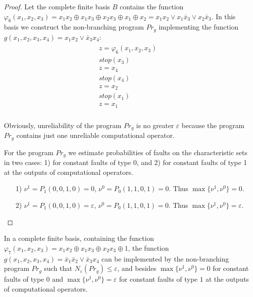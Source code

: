 \documentclass[
11pt,%
tightenlines,%
twoside,%
onecolumn,%
nofloats,%
nobibnotes,%
nofootinbib,%
superscriptaddress,%
noshowpacs,%
centertags]%
{revtex4}
\begin{document}
\begin{proof}
Let the complete finite basis $B$ contains  the function
$\varphi_6(x_1, x_2, x_3)=x_1 x_2\oplus x_1 x_3 \oplus x_2 x_3
\oplus x_1\oplus x_2 =x_1x_2\vee x_1\bar{x}_3\vee x_2\bar{x}_3$. In
this basis we construct the non-branching program $Pr_g$
implementing the function $g(x_1, x_2, x_3, x_4)= x_1 x_2 \vee
\bar{x}_3 x_4$:
\begin{eqnarray*}
\begin{array}{l}
  z=\varphi_6(x_1, x_2, x_3) \\
  stop(x_3) \\
  z=x_4 \\
  stop(x_4) \\
  z=x_2 \\
  stop(x_1) \\
  z=x_1 \\
\end{array}
\end{eqnarray*}

Obviously, unreliability of the program $Pr_g$ is no  greater
$\varepsilon$ because the program $Pr_g$ contains just one
unreliable computational operator.

For the program $Pr_g$ we estimate probabilities of faults  on the
characteristic sets in two cases: 1) for constant faults of type 0,
and 2) for constant faults of type 1 at the outputs of computational
operators.
\begin{itemize}
\item[1)] $\nu^1=P_1(0, 0, 1, 0)=0$,  $\nu^0=P_0(1, 1, 0, 1)=0$. Thus $\max\{\nu^1, \nu^0\}=0$.
\item[2)] $\nu^1=P_1(0, 0, 1, 0)=\varepsilon$,  $\nu^0=P_0(1, 1, 0, 1)=0$. Thus $\max\{\nu^1, \nu^0\}=\varepsilon$.
\end{itemize}

\end{proof}

\begin{lemma}\label{l8}
In a complete finite basis, containing the function $\varphi_7(x_1,
x_2, x_3)=x_1 x_2\oplus x_1 x_3 \oplus x_2 x_3 \oplus 1$, the
function $g(x_1, x_2, x_3, x_4)= \bar{x}_1\bar{x}_2 \vee \bar{x}_3
x_4$  can be implemented by the non-branching program $Pr_g$ such
that $N_\varepsilon(Pr_g)\leq \varepsilon$, and besides
$\max\{\nu^1, \nu^0\}=0$ for constant faults of type $0$ and
$\max\{\nu^1, \nu^0\}=\varepsilon$ for constant faults of type $1$
at the outputs of computational operators.
\end{lemma}
\end{document}
